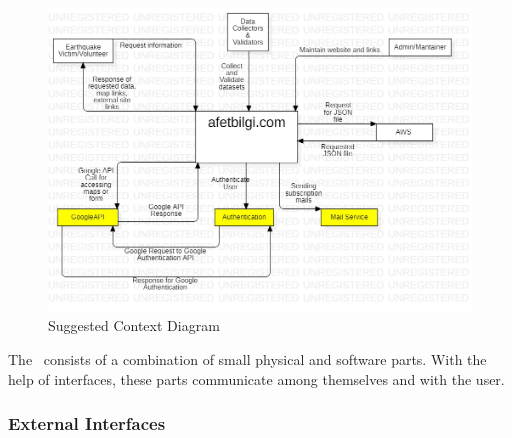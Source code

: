 \begin{figure}[H]
  \centering
  \includegraphics[width=\linewidth]{img/context-diagram-s5.jpg}
  \caption{Suggested Context Diagram}
\end{figure}

The \afetbilgi\ consists of a combination of small physical and software parts. With the help of interfaces, these parts communicate among themselves and with the user.

\subsubsection{External Interfaces}

